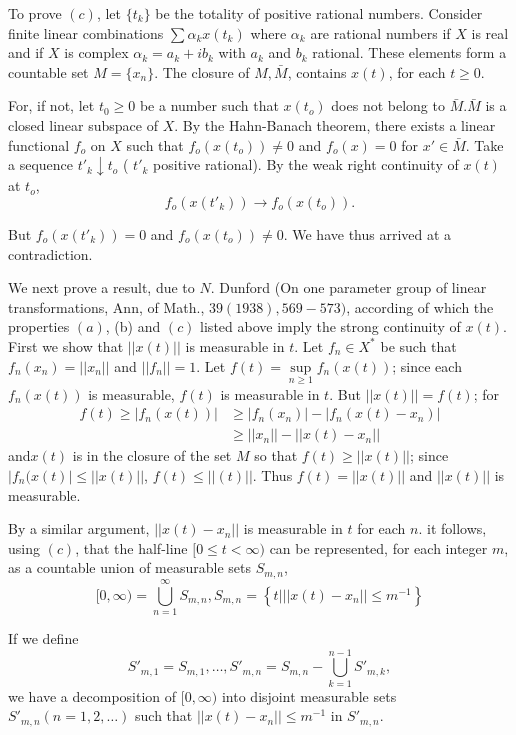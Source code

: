 To prove $(c)$, let $\{t_k\}$ be the totality of positive rational
numbers. Consider finite linear combinations $\sum \alpha_kx(t_k)$
where $\alpha_k$ are rational numbers if $X$ is real and if $X$ is
complex $\alpha_k =a_k+ ib_k$ with $a_k$ and $b_k$ rational. These
elements form a countable set $M=\{x_n\}$. The closure of $M,
\bar{M}$, contains $x(t)$, for each $t \ge 0$. 

For, if not, let $t_0 \ge 0$ be a number such that $x(t_o)$ does not
belong to $\bar{M}. \bar{M}$ is a closed linear subspace of $X$. By
the Hahn-Banach theorem, there exists a linear functional $f_o$ on
$X$ such that $f_o(x(t_o))\neq 0$ and $f_o(x)=0$ for $x' \in
\bar{M}$. Take a sequence $t'_k \downarrow t_o$ ( $t'_k$ positive
rational). By the weak right continuity of $x(t)$ at $t_o$, 
$$
f_o(x(t'_k)) \to f_o (x(t_o)).
$$

But $f_o (x(t'_k))=0$ and $f_o(x(t_o)) \neq 0$. We have thus arrived
at a contradiction. 

We next prove a result, due to $N$. Dunford (On one parameter group of
linear transformations, Ann, of Math., $39(1938), 569-573)$, according
of which the properties $(a)$, (b) and $(c)$ listed above imply the
strong continuity of $x(t)$. First we show that $|| x(t) ||$ is
measurable in $t$. Let $f_n \in X^*$ be such that $f_n (x_n)= || x_n
||$ and $|| f_n ||=1$. Let $f(t)= \sup\limits_{n \ge 1} f_n
(x(t))$; since each $f_n(x(t))$ is measurable, $f(t)$ is measurable in
$t$. But $|| x(t) ||= f(t)$; for 
\begin{align*}
 f(t) \ge |f_n(x(t)) | & \ge | f_n (x_n) | -| f_n(x(t) -x_n) |\\
 & \ge || x_n || - || x(t) -x_n || 
\end{align*} 
and\pageoriginale $x(t)$ is in the closure of the set $M$ so that $f(t) \ge || x(t)
||$; since $|f_n (x(t) |\le ||x(t) ||$, $f(t) \le || (t) ||$. Thus
$f(t)= || x(t) ||$ and $|| x(t) ||$ is measurable. 
 
By a similar argument, $|| x(t) -x_n ||$ is measurable in $t$ for each
$n$. it follows, using $(c)$, that the half-line $[0 \le t < \infty)$
 can be represented, for each integer $m$, as a countable union of
 measurable sets $S_{m,n}$, 
 $$
 [0, \infty) = \bigcup_{n=1}^\infty S_{m,n}, S_{m, n} = \left\{t | || x(t)
  -x_n || \le m^{-1} \right\} 
 $$
 
 If we define 
 $$
 S'_{m,1}= S_{m,1}, \ldots, S'_{m,n}= S_{m,n} - \bigcup_{k=1}^{n-1} S'_{m,k}, 
 $$
 we have a decomposition of $[0, \infty)$ into disjoint measurable sets
 $S'_{m,n}(n=1,2, \ldots)$ such that $|| x(t) -x_n || \le m^{-1}$ in
 $S'_{m,n}$. 
 
